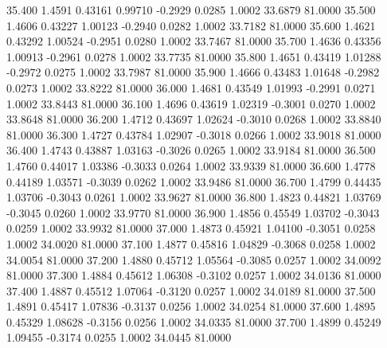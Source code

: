   35.400   1.4591   0.43161   0.99710  -0.2929   0.0285   1.0002  33.6879  81.0000
  35.500   1.4606   0.43227   1.00123  -0.2940   0.0282   1.0002  33.7182  81.0000
  35.600   1.4621   0.43292   1.00524  -0.2951   0.0280   1.0002  33.7467  81.0000
  35.700   1.4636   0.43356   1.00913  -0.2961   0.0278   1.0002  33.7735  81.0000
  35.800   1.4651   0.43419   1.01288  -0.2972   0.0275   1.0002  33.7987  81.0000
  35.900   1.4666   0.43483   1.01648  -0.2982   0.0273   1.0002  33.8222  81.0000
  36.000   1.4681   0.43549   1.01993  -0.2991   0.0271   1.0002  33.8443  81.0000
  36.100   1.4696   0.43619   1.02319  -0.3001   0.0270   1.0002  33.8648  81.0000
  36.200   1.4712   0.43697   1.02624  -0.3010   0.0268   1.0002  33.8840  81.0000
  36.300   1.4727   0.43784   1.02907  -0.3018   0.0266   1.0002  33.9018  81.0000
  36.400   1.4743   0.43887   1.03163  -0.3026   0.0265   1.0002  33.9184  81.0000
  36.500   1.4760   0.44017   1.03386  -0.3033   0.0264   1.0002  33.9339  81.0000
  36.600   1.4778   0.44189   1.03571  -0.3039   0.0262   1.0002  33.9486  81.0000
  36.700   1.4799   0.44435   1.03706  -0.3043   0.0261   1.0002  33.9627  81.0000
  36.800   1.4823   0.44821   1.03769  -0.3045   0.0260   1.0002  33.9770  81.0000
  36.900   1.4856   0.45549   1.03702  -0.3043   0.0259   1.0002  33.9932  81.0000
  37.000   1.4873   0.45921   1.04100  -0.3051   0.0258   1.0002  34.0020  81.0000
  37.100   1.4877   0.45816   1.04829  -0.3068   0.0258   1.0002  34.0054  81.0000
  37.200   1.4880   0.45712   1.05564  -0.3085   0.0257   1.0002  34.0092  81.0000
  37.300   1.4884   0.45612   1.06308  -0.3102   0.0257   1.0002  34.0136  81.0000
  37.400   1.4887   0.45512   1.07064  -0.3120   0.0257   1.0002  34.0189  81.0000
  37.500   1.4891   0.45417   1.07836  -0.3137   0.0256   1.0002  34.0254  81.0000
  37.600   1.4895   0.45329   1.08628  -0.3156   0.0256   1.0002  34.0335  81.0000
  37.700   1.4899   0.45249   1.09455  -0.3174   0.0255   1.0002  34.0445  81.0000
